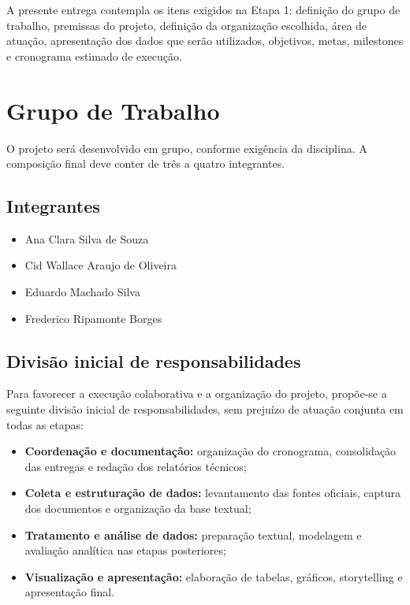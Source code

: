 \documentclass[12pt,a4paper]{article}
\begin{document}
A presente entrega contempla os itens exigidos na Etapa 1: definição do grupo de trabalho, premissas do projeto, definição da organização escolhida, área de atuação, apresentação dos dados que serão utilizados, objetivos, metas, milestones e cronograma estimado de execução.

\clearpage
\section{Grupo de Trabalho}

O projeto será desenvolvido em grupo, conforme exigência da disciplina. A composição final deve conter de três a quatro integrantes.

\subsection{Integrantes}

\begin{itemize}[leftmargin=1.2cm]
    \item Ana Clara Silva de Souza
    \item Cid Wallace Araujo de Oliveira
    \item Eduardo Machado Silva
    \item Frederico Ripamonte Borges
\end{itemize}

\subsection{Divisão inicial de responsabilidades}

Para favorecer a execução colaborativa e a organização do projeto, propõe-se a seguinte divisão inicial de responsabilidades, sem prejuízo de atuação conjunta em todas as etapas:

\begin{itemize}[leftmargin=1.2cm]
    \item \textbf{Coordenação e documentação:} organização do cronograma, consolidação das entregas e redação dos relatórios técnicos;
    \item \textbf{Coleta e estruturação de dados:} levantamento das fontes oficiais, captura dos documentos e organização da base textual;
    \item \textbf{Tratamento e análise de dados:} preparação textual, modelagem e avaliação analítica nas etapas posteriores;
    \item \textbf{Visualização e apresentação:} elaboração de tabelas, gráficos, storytelling e apresentação final.
\end{itemize}
\end{document}
